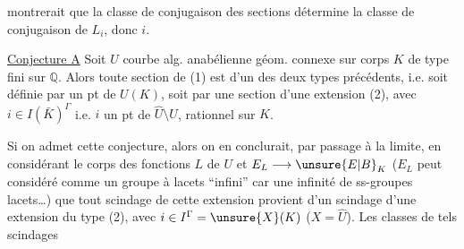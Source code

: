 montrerait que la classe de conjugaison des sections détermine la classe de conjugaison de $L_i$, donc $i$.

\uline{Conjecture A} Soit $U$ courbe alg. anabélienne géom. connexe sur corps $K$ de type fini sur $\mathbb{Q}$. Alors toute section de (1) est  d'un des deux types précédents, i.e. soit définie par un pt de $U(K)$, soit par une section d'une extension (2), avec $i\in I(\bar K)^\Gamma$ i.e. $i$ un pt de $\widehat U\setminus U$, rationnel sur $K$.

Si on admet cette conjecture, alors on en conclurait, par passage à la limite, en considérant le corps des fonctions $L$ de $U$ et $E_L\longrightarrow \unsure{E|B}_K$ ($E_L$ peut  considéré comme un groupe à lacets ``infini'' car une infinité de  ss-groupes lacets\ldots) que tout scindage de cette extension provient d'un scindage d'une extension du type (2), avec $i\in I^\Gamma=\unsure{X}(K)$ ($X=\widehat U$). Les classes  de tels scindages
